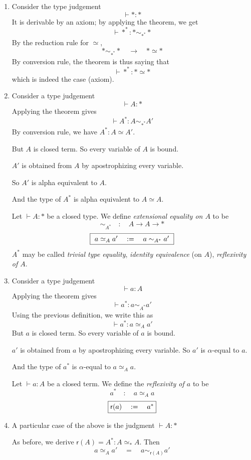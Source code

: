 \documentclass[10pt]{article}
\newcommand{\lRa}{\longrightarrow}
\newcommand{\sta}{*}
\newcommand{\ee}[1]{\simeq_{#1}}
\newcommand{\refl}[1]{{\mathsf{r}({#1})}}
\newcommand{\eq}{\quad=\quad}
\newcommand{\of}{\quad : \quad}
\newcommand{\rrule}{\hspace{1em}\lRa\hspace{1em}}
\newcommand{\eeq}{\simeq}
\renewcommand{\refl}[1]{\mathsf{r}({#1})}
\newcommand{\df}{\quad:=\quad}
\newenvironment{definition}{{\sc Definition.}}{}
\begin{document}
\begin{enumerate}
\item Consider the type judgement
  \[ \vdash \sta : \sta \]
It is derivable by an axiom; by applying the theorem, we get
\[ \vdash \sta^* : \sta \sim_{\sta^*} \sta \]
By the reduction rule for $\eeq$,
\[ \sta \sim_{\sta^*} \sta \rrule \sta \eeq \sta \]
By conversion rule, the theorem is thus saying that
\[ \vdash \sta^* : \sta \eeq \sta \]
which is indeed the case (axiom).
\item 
Consider a type judgement
\[ \vdash A : \sta \]
Applying the theorem gives
\[ \vdash A^* : A \sim_{\sta^*} A' \]
By conversion rule, we have $A^* : A \eeq A'$.

But $A$ is closed term.  So every variable of $A$ is bound.

$A'$ is obtained from $A$ by apostrophizing every variable.

So $A'$ is alpha equivalent to $A$.

And the type of $A^*$ is alpha equivalent to $A \eeq A$.

\begin{definition}
  Let $\vdash A : \sta$ be a closed type.  We define \emph{extensional
    equality on $A$} to be \[\sim_{A^*} \of A \to A \to \sta\]
\[    \fbox{ $a \ee A a' \df a \sim_{A^*} a'$ }\]
\end{definition}
$A^*$ may be called \emph{trivial type equality}, \emph{identity equivalence} (on $A$),
\emph{reflexivity of $A$}.

\item Consider a type judgement
\[ \vdash a :A\]
Applying the theorem gives
\[ \vdash a^* : a \sim_{A^*} a' \]
Using the previous definition, we write this as
\[ \vdash a^* : a \ee A a' \]
But $a$ is closed term.  So every variable of $a$ is bound.

$a'$ is obtained from $a$ by apostrophizing every variable.
So $a'$ is $\alpha$-equal to $a$.

And the type of $a^*$ is $\alpha$-equal to $a \ee A a$.

\begin{definition}
Let $\vdash a : A$ be a closed term.  We define the \emph{reflexivity
  of $a$} to be \[a^* \of a \ee A a\]
\[ \fbox{$ \refl{a} \df a^* $}\]
\end{definition}
\item
A particular case of the above is the judgment $ \vdash A : \sta $

As before, we derive $\refl{A} = A^\sta : A \ee \sta A$.  Then
\[ a \ee A a' \eq a \sim_{\refl{A}} a' \]


\end{enumerate}
\end{document}
